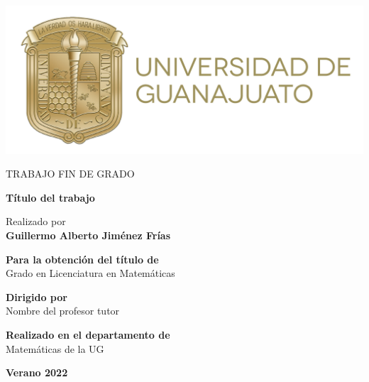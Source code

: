 \begin{center}


\includegraphics[scale=0.8]{figuras/logoUG.png}

\vspace*{1cm}
\begin{large}
TRABAJO FIN DE GRADO
\end{large}

\vspace*{0.1in}
\textbf{\huge Título del trabajo} %

\vspace*{.2in}

{\large Realizado por}\\

\textbf{\Large Guillermo Alberto Jiménez Frías} %

\vspace*{2cm}

\textbf{Para la obtención del título de}\\
{\large Grado en Licenciatura en Matemáticas} %

\vspace*{0.2in}

\textbf{Dirigido por}\\
{\large Nombre del profesor tutor}\\ %

\vspace*{0.2in}

\textbf{Realizado en el departamento de}\\
{\large Matemáticas de la UG}

\vspace*{.6in}
\textbf{\Large Verano 2022} %

\end{center}


\thispagestyle{empty} %
\clearpage\setcounter{page}{1} %
